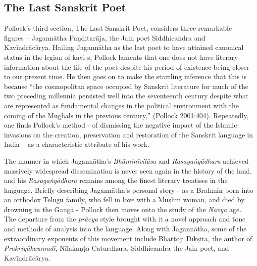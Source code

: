 \subsection{The Last Sanskrit Poet}

Pollock’s third section, The Last Sanskrit Poet, considers three remarkable figures – Jagannātha Paṇḍitarāja, the Jain poet Siddhicandra and Kavīndrācārya. Hailing Jagannātha as the last poet to have attained canonical status in the legion of kavi-s, Pollock laments that one does not have literary information about the life of the poet despite his period of existence being closer to our present time. He then goes on to make the startling inference that this is because “the cosmopolitan space occupied by Sanskrit literature for much of the two preceding millennia persisted well into the seventeenth century despite what are represented as fundamental changes in the political environment with the coming of the Mughals in the previous century,” (Pollock 2001:404). Repeatedly, one finds Pollock’s method - of dismissing the negative impact of the Islamic invasions on the creation, preservation and restoration of the Sanskrit language in India – as a characteristic attribute of his work.

The manner in which Jagannātha’s {\sl Bhāminīvilāsa} and {\sl Rasagaṅgādhara} achieved massively widespread dissemination is never seen again in the history of the land, and his {\sl Rasagaṅgādhara} remains among the finest literary treatises in the language. Briefly describing Jagannātha’s personal story - as a Brahmin born into an orthodox Telugu family, who fell in love with a Muslim woman, and died by drowning in the Gaṅgā - Pollock then moves onto the study of the {\sl Navya} age. The departure from the {\sl prācya} style brought with it a novel approach and tone and methods of analysis into the language. Along with Jagannātha, some of the extraordinary exponents of this movement include Bhaṭṭoji Dīkṣita, the author of {\sl Prakriyākaumudī}, Nīlakaṇṭa Caturdhara, Siddhicandra the Jain poet, and Kavīndrācārya.

